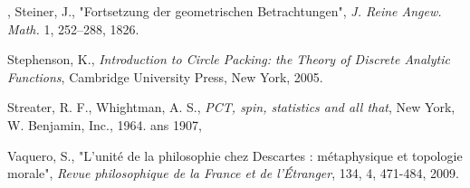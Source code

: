 \documentclass[12pt]{article}
\theoremstyle{définition}
\theoremstyle{remark}
\theoremstyle{plain}
\theoremstyle{plain}
\begin{document}
\begin{thebibliography}{}
 , Steiner, J., "Fortsetzung der geometrischen Betrachtungen", {\it J. Reine Angew. Math.} 1, 252–288, 1826.

 Stephenson, K., {\it Introduction to Circle Packing: the Theory of Discrete Analytic Functions}, Cambridge University Press, New York, 2005.

 Streater,  R. F., Whightman, A. S., {\it PCT, spin, statistics and all that}, New York, W. Benjamin, Inc., 1964.
ans 1907,

 Vaquero, S., "L'unité de la philosophie chez Descartes : métaphysique et topologie morale", {\it Revue philosophique de la France et de l'\'{E}tranger}, 134, 4, 471-484, 2009.


\end{thebibliography}
\end{document}
